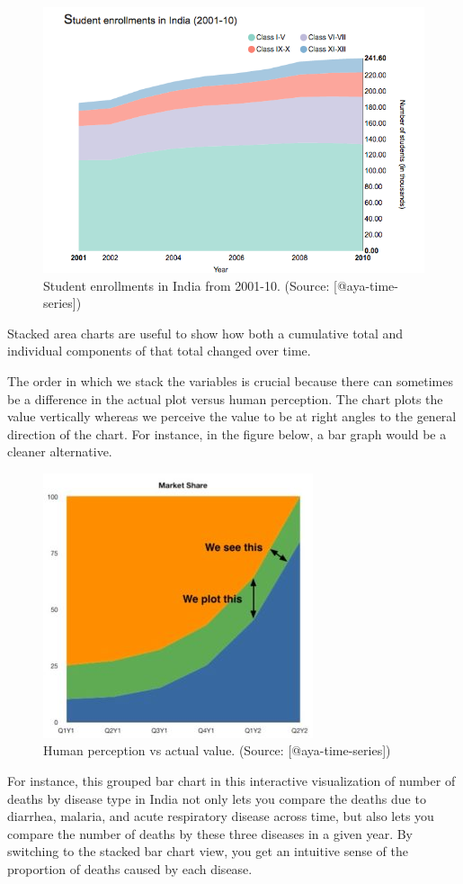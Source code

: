\documentclass[]{book}
\theoremstyle{definition}
\theoremstyle{definition}
\theoremstyle{definition}
\theoremstyle{remark}
\begin{document}
\begin{figure}

{\centering \includegraphics[width=0.6\linewidth]{images/aya-stacked} 

}

\caption{Student enrollments in India from 2001-10. (Source: [@aya-time-series])}\label{fig:aya-stacked}
\end{figure}

Stacked area charts are useful to show how both a cumulative total and
individual components of that total changed over time.

The order in which we stack the variables is crucial because there can
sometimes be a difference in the actual plot versus human perception.
The chart plots the value vertically whereas we perceive the value to be
at right angles to the general direction of the chart. For instance, in
the figure below, a bar graph would be a cleaner alternative.

\begin{figure}

{\centering \includegraphics[width=0.3\linewidth]{images/aya-stacked-perception} 

}

\caption{Human perception vs actual value. (Source: [@aya-time-series])}\label{fig:aya-stacked-perception}
\end{figure}

For instance, this grouped bar chart in this interactive visualization
of number of deaths by disease type in India not only lets you compare
the deaths due to diarrhea, malaria, and acute respiratory disease
across time, but also lets you compare the number of deaths by these
three diseases in a given year. By switching to the stacked bar chart
view, you get an intuitive sense of the proportion of deaths caused by
each disease.
\end{document}
